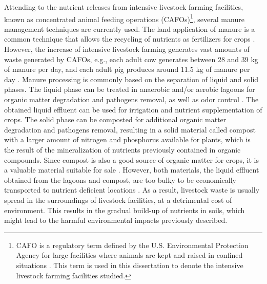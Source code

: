 \begin{refsection}[referencesCh1]
Attending to the nutrient releases from intensive livestock farming facilities, known as concentrated animal feeding operations (CAFOs)\footnote{CAFO is a regulatory term defined by the U.S. Environmental Protection Agency for large facilities where animals are kept and raised in confined situations \citep{animal_unit_definition}. This term is used in this dissertation to denote the intensive livestock farming facilities studied.}, several manure management techniques are currently used. The land application of manure is a common technique that allows the recycling of nutrients as fertilizers for crops \citep{Kellog2010}. However, the increase of intensive livestock farming generates vast amounts of waste generated by CAFOs, e.g., each adult cow generates between 28 and 39 kg of manure per day, and each adult pig produces around 11.5 kg of manure per day \citep{USDAHandbook}. Manure processing is commonly based on the separation of liquid and solid phases. The liquid phase can be treated in anaerobic and/or aerobic lagoons for organic matter degradation and pathogens removal, as well as odor control \citep{tilley2014compendium}. The obtained liquid effluent can be used for irrigation and nutrient supplementation of crops. The solid phase can be composted for additional organic matter degradation and pathogens removal, resulting in a solid material called compost with a larger amount of nitrogen and phosphorus available for plants, which is the result of the mineralization of nutrients previously contained in organic compounds. Since compost is also a good source of organic matter for crops, it is a valuable material suitable for sale \citep{tilley2014compendium}. However, both materials, the liquid effluent obtained from the lagoons and compost, are too bulky to be economically transported to nutrient deficient locations \citep{burns2002phosphorus}. As a result, livestock waste is usually spread in the surroundings of livestock facilities, at a detrimental cost of environment. This results in the gradual build-up of nutrients in soils, which might lead to the harmful environmental impacts previously described.


\end{refsection}

